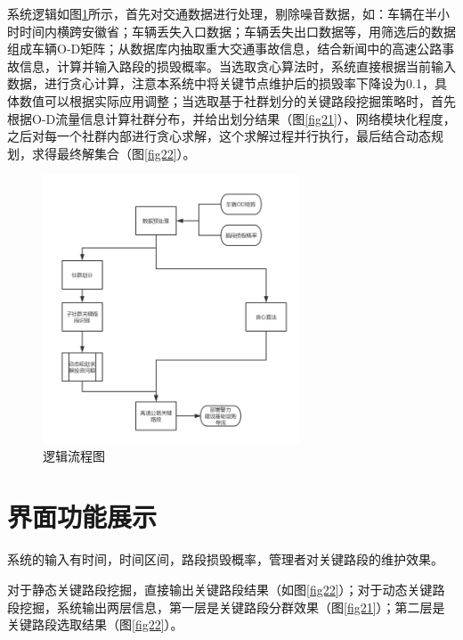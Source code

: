 		系统逻辑如图\ref{fig30}所示，首先对交通数据进行处理，剔除噪音数据，如：车辆在半小时时间内横跨安徽省；车辆丢失入口数据；车辆丢失出口数据等，用筛选后的数据组成车辆O-D矩阵；从数据库内抽取重大交通事故信息，结合新闻中的高速公路事故信息，计算并输入路段的损毁概率。当选取贪心算法时，系统直接根据当前输入数据，进行贪心计算，注意本系统中将关键节点维护后的损毁率下降设为0.1，具体数值可以根据实际应用调整；当选取基于社群划分的关键路段挖掘策略时，首先根据O-D流量信息计算社群分布，并给出划分结果（图\ref{fig21}）、网络模块化程度，之后对每一个社群内部进行贪心求解，这个求解过程并行执行，最后结合动态规划，求得最终解集合（图\ref{fig22}）。
		\begin{figure}[h]
		\centering
				\begin{minipage}{0.8\linewidth}
					\centering
					\includegraphics[width=3in]{picture/liuchengtu}
					\caption{逻辑流程图}
					\label{fig30}
				\end{minipage}%
		\end{figure}


	\section{界面功能展示}

		系统的输入有时间，时间区间，路段损毁概率，管理者对关键路段的维护效果。

		对于静态关键路段挖掘，直接输出关键路段结果（如图\ref{fig22}）；对于动态关键路段挖掘，系统输出两层信息，第一层是关键路段分群效果（图\ref{fig21}）；第二层是关键路段选取结果（图\ref{fig22}）。

